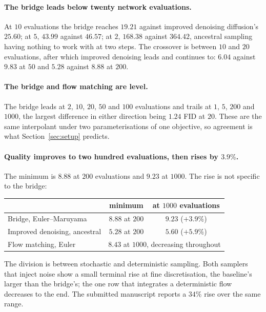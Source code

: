 \documentclass[11pt,a4paper]{article}
\begin{document}
\paragraph{The bridge leads below twenty network evaluations.} At $10$
evaluations the bridge reaches $19.21$ against improved denoising diffusion's
$25.60$; at $5$, $43.99$ against $46.57$; at $2$, $168.38$ against $364.42$,
ancestral sampling having nothing to work with at two steps. The crossover is
between $10$ and $20$ evaluations, after which improved denoising leads and
continues to: $6.04$ against $9.83$ at $50$ and $5.28$ against $8.88$ at $200$.

\paragraph{The bridge and flow matching are level.} The bridge leads at $2$,
$10$, $20$, $50$ and $100$ evaluations and trails at $1$, $5$, $200$ and $1000$,
the largest difference in either direction being $1.24$ FID at $20$. These are
the same interpolant under two parameterisations of one objective, so agreement
is what Section~\ref{sec:setup} predicts.

\paragraph{Quality improves to two hundred evaluations, then rises by $3.9\%$.}
The minimum is $8.88$ at $200$ evaluations and $9.23$ at $1000$. The rise is not
specific to the bridge:

\begin{center}
\begin{tabular}{lcc}
\toprule
& minimum & at $1000$ evaluations\\
\midrule
Bridge, Euler--Maruyama & $8.88$ at $200$ & $9.23$ \quad($+3.9\%$)\\
Improved denoising, ancestral & $5.28$ at $200$ & $5.60$ \quad($+5.9\%$)\\
Flow matching, Euler & \multicolumn{2}{c}{$8.43$ at $1000$, decreasing throughout}\\
\bottomrule
\end{tabular}
\end{center}

The division is between stochastic and deterministic sampling. Both samplers
that inject noise show a small terminal rise at fine discretisation, the
baseline's larger than the bridge's; the one row that integrates a
deterministic flow decreases to the end. The submitted manuscript reports a
$34\%$ rise over the same range.
\end{document}
